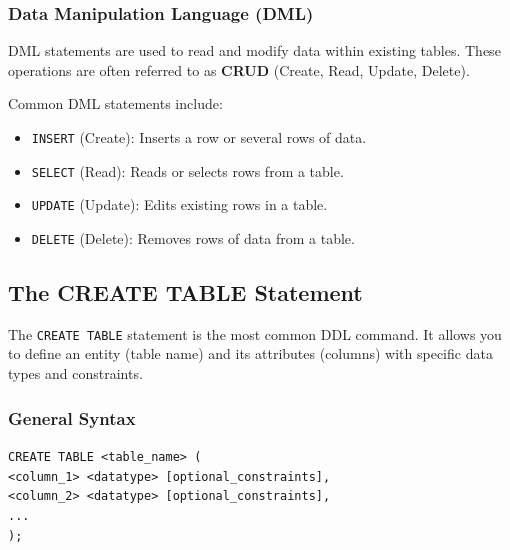 \documentclass{article}
\begin{document}
\subsubsection{Data Manipulation Language (DML)}
DML statements are used to read and modify data within existing tables. These operations are often referred to as \textbf{CRUD} (Create, Read, Update, Delete).

Common DML statements include:
\begin{itemize}
    \item \texttt{INSERT} (Create): Inserts a row or several rows of data.
    \item \texttt{SELECT} (Read): Reads or selects rows from a table.
    \item \texttt{UPDATE} (Update): Edits existing rows in a table.
    \item \texttt{DELETE} (Delete): Removes rows of data from a table.
\end{itemize}

\subsection{The CREATE TABLE Statement}

The \texttt{CREATE TABLE} statement is the most common DDL command. It allows you to define an entity (table name) and its attributes (columns) with specific data types and constraints.



\subsubsection{General Syntax}
\begin{FormulaBox}
\texttt{CREATE TABLE <table\_name> ( \\
\hspace*{1em} <column\_1> <datatype> [optional\_constraints], \\
\hspace*{1em} <column\_2> <datatype> [optional\_constraints], \\
\hspace*{1em} ... \\
);}
\end{FormulaBox}
\end{document}
